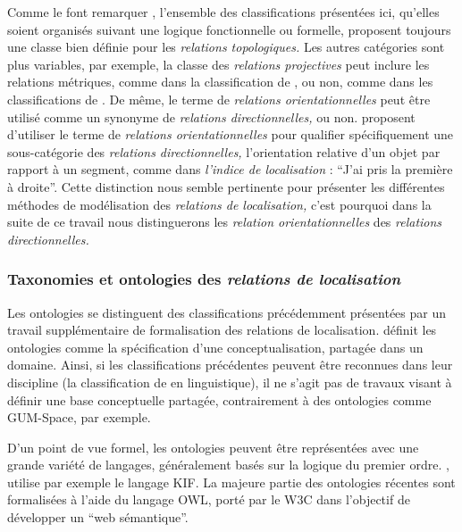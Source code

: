 Comme le font remarquer \textcite{Duchene2019}, l'ensemble des
classifications présentées ici, qu'elles soient organisés suivant une
logique fonctionnelle ou formelle, proposent toujours une classe bien
définie pour les \emph{relations topologiques.} Les autres catégories
sont plus variables, par exemple, la classe des \emph{relations
  projectives} peut inclure les relations métriques, comme dans la
classification de \textcite{Borillo1998}, ou non, comme dans les
classifications de \textcite{Bateman2010, Pustejovsky2017}. De même,
le terme de \emph{relations orientationnelles} peut être utilisé comme
un synonyme de \emph{relations directionnelles,} ou
non. \textcite{Duchene2019} proposent d'utiliser le terme de
\emph{relations orientationnelles} pour qualifier spécifiquement une
sous-catégorie des \emph{relations directionnelles,} l'orientation
relative d'un objet par rapport à un segment, comme dans
\emph{l'indice de localisation} : \enquote{J'ai pris la première à
  droite}. Cette distinction nous semble pertinente pour présenter les
différentes méthodes de modélisation des \emph{relations de
  localisation,} c'est pourquoi dans la suite de ce travail nous
distinguerons les \emph{relation orientationnelles} des
\emph{relations directionnelles.}

\subsubsection{Taxonomies et ontologies des \emph{relations de localisation}}

Les ontologies se distinguent des classifications précédemment
présentées par un travail supplémentaire de formalisation des
relations de localisation. \textcite{Gruber1993} définit les
ontologies comme la spécification d'une conceptualisation, partagée
dans un domaine. Ainsi, si les classifications précédentes peuvent
être reconnues dans leur discipline (\eg la classification de
\textcite{Borillo1998} en linguistique), il ne s'agit pas de travaux
visant à définir une base conceptuelle partagée, contrairement à des
ontologies comme GUM-Space, par exemple.

D'un point de vue formel, les ontologies peuvent être représentées
avec une grande variété de langages, généralement basés sur la logique
du premier ordre. \textcite{Gruber1993}, utilise par exemple le
langage KIF. La majeure partie des ontologies récentes sont
formalisées à l'aide du langage OWL, porté par le W3C dans l'objectif
de développer un \enquote{web sémantique}.

